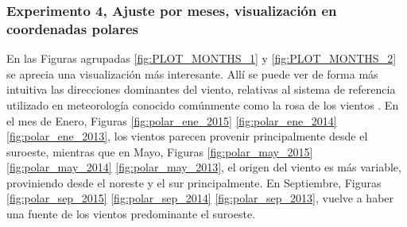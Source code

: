 \subsubsection{Experimento 4, Ajuste por meses, visualización en coordenadas polares}
En las Figuras agrupadas \ref{fig:PLOT_MONTHS_1} y \ref{fig:PLOT_MONTHS_2} se aprecia una visualización más interesante. Allí se puede ver de forma más intuitiva las direcciones dominantes del viento, relativas al sistema de referencia utilizado en meteorología conocido comúnmente como la rosa de los vientos \cite{RosaViento}. En el mes de Enero, Figuras \ref{fig:polar_ene_2015} \ref{fig:polar_ene_2014} \ref{fig:polar_ene_2013}, los vientos parecen provenir principalmente desde el suroeste, mientras que en Mayo, Figuras \ref{fig:polar_may_2015} \ref{fig:polar_may_2014} \ref{fig:polar_may_2013}, el origen del viento es más variable, proviniendo desde el noreste y el sur principalmente. En Septiembre, Figuras \ref{fig:polar_sep_2015} \ref{fig:polar_sep_2014} \ref{fig:polar_sep_2013}, vuelve a haber una fuente de los vientos predominante el suroeste.
